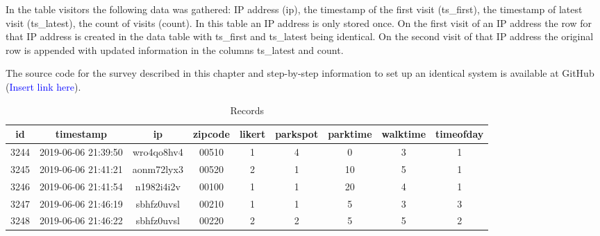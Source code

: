 In the table visitors the following data was gathered: IP address (ip), the timestamp of the first visit (ts\_first), the timestamp of latest visit (ts\_latest), the count of visits (count). In this table an IP address is only stored once. On the first visit of an IP address the row for that IP address is created in the data table with ts\_first and ts\_latest being identical. On the second visit of that IP address the original row is appended with updated information in the columns ts\_latest and count.

The source code for the survey described in this chapter and step-by-step information to set up an identical system is available at GitHub (\textcolor{blue}{Insert link here}).

\begin{table}[!htbp] %
    \begin{adjustwidth}{-1cm}{-1cm} %
        \begin{centering}
            \begin{tabular}{|c c c c c c c c c|} 
                \hline
                id & timestamp & ip & zipcode & likert & parkspot & parktime & walktime & timeofday \\ [0.5ex] 
                \hline\hline
                3244 & 2019-06-06 21:39:50 & wro4qo8hv4 & 00510 & 1 & 4 & 0 & 3 & 1\\ [0.25ex]
                \hline
                3245 & 2019-06-06 21:41:21 & aonm72lyx3 & 00520 & 2 & 1 & 10 & 5 & 1 \\ [0.25ex] 
                \hline
                3246 & 2019-06-06 21:41:54 & n1982i4i2v & 00100 & 1 & 1 & 20 & 4 & 1 \\ [0.25ex] 
                \hline
                3247 & 2019-06-06 21:46:19 & sbhfz0uvsl & 00210 & 1 & 1 & 5 & 3 & 3 \\ [0.25ex] 
                \hline
                3248 & 2019-06-06 21:46:22 & sbhfz0uvsl & 00220 & 2 & 2 & 5 & 5 & 2 \\ [1ex]
                \hline
            \end{tabular}
            \caption{Records} \label{tab:recordstab}
        \end{centering}
    \end{adjustwidth}
\end{table}

